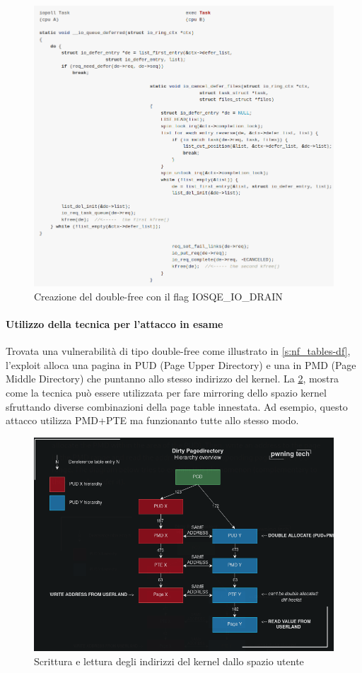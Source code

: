 \documentclass{article}
\begin{document}
\begin{figure}[h]
  \begin{center}
    \includegraphics[width=.85\textwidth]{figures/ch1/dirtypt_2-df.png}
  \end{center}
  \caption{Creazione del double-free con il flag IOSQE\_IO\_DRAIN}\label{fig:dirty-df}
\end{figure}

\paragraph{Utilizzo della tecnica per l'attacco in esame} Trovata una vulnerabilità di tipo 
double-free come illustrato in \cref{s:nf_tables-df},  
l'exploit alloca una pagina in PUD (Page Upper Directory) e una in PMD (Page Middle Directory) 
che puntanno allo stesso indirizzo del kernel. La \cref{fig:dirtypt-nftables}, 
mostra come la tecnica può essere utilizzata per fare mirroring dello spazio kernel sfruttando 
diverse combinazioni della page table innestata. Ad esempio, questo attacco utilizza PMD+PTE 
ma funzionanto tutte allo stesso modo. 

\begin{figure}[h]
  \begin{center}
    \includegraphics[width=.6\textwidth]{figures/ch1/dirtypt_current.png}
  \end{center}
  \caption{Scrittura e lettura degli indirizzi del kernel dallo spazio utente}\label{fig:dirtypt-nftables}
\end{figure}
\end{document}
